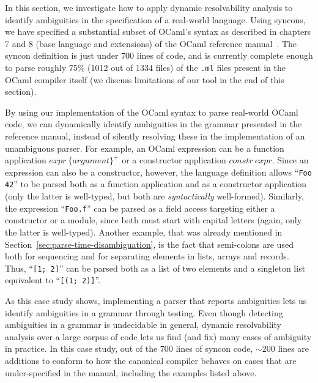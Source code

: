 \documentclass[runningheads]{llncs}
\newcommand{\ocaml}{\lstinline[language={[objective]caml}]}
\begin{document}
In this section, we investigate how to apply dynamic resolvability
analysis to identify ambiguities in the specification of a
real-world language.
%
Using syncons, we have specified a substantial subset of OCaml's
syntax as described in chapters 7 and 8 (base language and
extensions) of the OCaml reference manual~\cite{leroyOCamlSystemRelease2018}.
The syncon definition is just under 700 lines of code, and is
currently complete enough to parse roughly 75\% (1012 out of 1334
files) of the \verb|.ml| files present in the OCaml compiler
itself (we discuss limitations of our tool in the end of this
section).

By using our implementation of the OCaml syntax to parse
real-world OCaml code, we can dynamically identify ambiguities in
the grammar presented in the reference manual, instead of silently
resolving these in the implementation of an unambiguous parser.
%
For example, an OCaml expression can be a function application
$\mathit{expr}~\{\mathit{argument}\}^{+}$ or a constructor
application $\mathit{constr}~\mathit{expr}$. Since an expression
can also be a constructor, however, the language definition allows
``\ocaml{Foo 42}'' to be parsed both as a function application and
as a constructor application (only the latter is well-typed, but
both are \emph{syntactically} well-formed).
%
Similarly, the expression ``\ocaml{Foo.f}'' can be parsed as a
field access targeting either a constructor or a module, since
both must start with capital letters (again, only the latter is
well-typed).
%
Another example, that was already mentioned in
Section~\ref{sec:parse-time-disambiguation}, is the fact that
semi-colons are used both for sequencing and for separating
elements in lists, arrays and records. Thus, ``\ocaml{[1; 2]}''
can be parsed both as a list of two elements and a singleton list
equivalent to ``\ocaml{[(1; 2)]}''.

As this case study shows, implementing a parser that reports
ambiguities lets us identify ambiguities in a grammar through
testing. Even though detecting ambiguities in a grammar is
undecidable in general, dynamic resolvability analysis over a
large corpus of code lets us find (and fix) many cases of
ambiguity in practice.
%
In this case study, out of the 700 lines of syncon code, $\sim$200
lines are additions to conform to how the canonical compiler
behaves on cases that are under-specified in the
manual, including the examples listed above.

\end{document}
